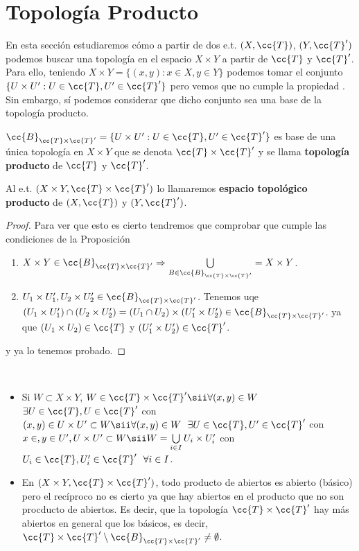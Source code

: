 \section{Topología Producto}
En esta sección estudiaremos cómo a partir de dos e.t. $(X, \cc{T})$, $(Y, \cc{T}')$ podemos buscar una topología en el espacio $X\times Y$ a partir de $\cc{T}$ y $\cc{T}'$. Para ello, teniendo $X\times Y=\{(x,y):x\in X, y \in Y\}$ podemos tomar el conjunto $\{U\times U' : U\in \cc{T}, U'\in \cc{T}'\}$ pero vemos que no cumple la propiedad . Sin embargo, sí podemos considerar que dicho conjunto sea una base de la topología producto.

\begin{prop}
    $\cc{B}_{\cc{T}\times \cc{T}'}=\{U\times U' : U\in \cc{T}, U'\in \cc{T}'\}$ es base de una única topología en $X\times Y$ que se denota $\cc{T}\times \cc{T}'$ y se llama \textbf{topología producto} de $\cc{T}$ y $\cc{T}'$. 

    Al e.t. $(X\times Y, \cc{T}\times \cc{T}')$ lo llamaremos \textbf{espacio topológico producto} de $(X, \cc{T})$ y $(Y, \cc{T}')$.

    \begin{proof} Para ver que esto es cierto tendremos que comprobar que cumple las condiciones de la Proposición %
        \begin{enumerate}
            \item[\apuntar{B1}] $X\times Y \in \cc{B}_{\cc{T}\times \cc{T}'}\Rightarrow \bigcup\limits_{B\in \cc{B}_{\cc{T}\times \cc{T}'}}=X\times Y$.
            \item[\apuntar{B2}] $U_1\times U_1', U_2\times U_2'\in \cc{B}_{\cc{T}\times \cc{T}'}$. Tenemos uqe $(U_1\times U_1')\cap (U_2\times U_2') = (U_1\cap U_2)\times (U_1'\times U_2')\in \cc{B}_{\cc{T}\times \cc{T}'}$. ya que $(U_1\times U_2)\in \cc{T}$ y $(U_1'\times U_2')\in \cc{T}'$.
        \end{enumerate}
        y ya lo tenemos probado.

    \end{proof}
\end{prop}

\begin{observacion}\
    \begin{itemize}
        \item Si $W\subset X\times Y$, $W\in \cc{T}\times \cc{T}'\sii \forall (x,y)\in W$\ \ $\exists U\in \cc{T}, U\in \cc{T}'$ con $(x,y)\in U\times U'\subset W \sii \forall (x,y)\in W\ \ \exists U\in \cc{T}, U'\in \cc{T}'$ con $x\in , y \in U', U\times U'\subset W \sii W=\bigcup\limits_{i\in I}U_i\times U_i'$ con $U_i\in \cc{T}, U_i'\in \cc{T}'\ \ \forall i\in I$.
        \item En $(X\times Y, \cc{T}\times \cc{T}')$, todo producto de abiertos es abierto (básico) pero el recíproco no es cierto ya que hay abiertos en el producto que no son procducto de abiertos. Es decir, que la topología $\cc{T}\times \cc{T}'$ hay más abiertos en general que los básicos, es decir, $\cc{T}\times \cc{T}'\setminus \cc{B}_{\cc{T}\times \cc{T}'}\neq \emptyset$.
    \end{itemize}
\end{observacion}

